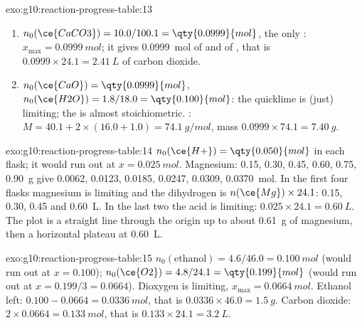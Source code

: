 \begin{solution}{exo:g10:reaction-progress-table:13}
\begin{enumerate}
  \item $n_0(\ce{CaCO3}) = 10.0 / 100.1 = \qty{0.0999}{mol}$, the only
        : $x_{\max} = \qty{0.0999}{mol}$; it gives
        \qty{0.0999}{mol} of  and of , that is
        $0.0999 \times 24.1 = \qty{2.41}{L}$ of carbon dioxide.
  \item $n_0(\ce{CaO}) = \qty{0.0999}{mol}$, $n_0(\ce{H2O}) = 1.8 / 18.0
        = \qty{0.100}{mol}$: the quicklime is (just) limiting; the
         is almost stoichiometric. :
        $M = 40.1 + 2 \times (16.0 + 1.0) = \qty{74.1}{g/mol}$, mass
        $0.0999 \times 74.1 = \qty{7.40}{g}$.
\end{enumerate}
\end{solution}

\begin{solution}{exo:g10:reaction-progress-table:14}
$n_0(\ce{H+}) = \qty{0.050}{mol}$ in each flask; it would run out at
$x = \qty{0.025}{mol}$. Magnesium: 0.15, 0.30, 0.45, 0.60, 0.75,
\qty{0.90}{g} give 0.0062, 0.0123, 0.0185, 0.0247, 0.0309,
\qty{0.0370}{mol}. In the first four flasks magnesium is limiting
and the dihydrogen is $n(\ce{Mg}) \times 24.1$: 0.15, 0.30, 0.45 and
\qty{0.60}{L}. In the last two the acid is limiting: $0.025 \times 24.1
= \qty{0.60}{L}$. The plot is a straight line through the origin up to
about \qty{0.61}{g} of magnesium, then a horizontal plateau at
\qty{0.60}{L}.
\end{solution}

\begin{solution}{exo:g10:reaction-progress-table:15}
$n_0(\text{ethanol}) = 4.6 / 46.0 = \qty{0.100}{mol}$ (would run out at
$x = 0.100$); $n_0(\ce{O2}) = 4.8 / 24.1 = \qty{0.199}{mol}$ (would run
out at $x = 0.199/3 = 0.0664$). Dioxygen is limiting,
$x_{\max} = \qty{0.0664}{mol}$. Ethanol left: $0.100 - 0.0664 =
\qty{0.0336}{mol}$, that is $0.0336 \times 46.0 = \qty{1.5}{g}$. Carbon
dioxide: $2 \times 0.0664 = \qty{0.133}{mol}$, that is
$0.133 \times 24.1 = \qty{3.2}{L}$.
\end{solution}

